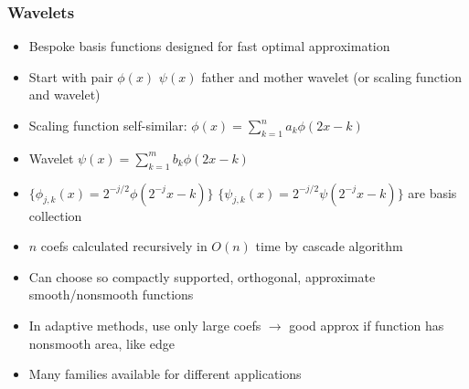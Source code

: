 \documentclass[bigger]{beamer}
\begin{document}
\begin{frame}%

\frametitle{Wavelets}

\begin{itemize}
\item Bespoke basis functions designed for fast optimal approximation
\item Start with pair $\phi(x)$ $\psi(x)$ father and mother wavelet (or scaling function and wavelet)
\item Scaling function self-similar: $\phi(x)=\sum_{k=1}^{n}a_k\phi(2x-k)$
\item Wavelet $\psi(x)=\sum_{k=1}^{m}b_k\phi(2x-k)$
\item $\{\phi_{j,k}(x)=2^{-j/2}\phi(2^{-j}x-k)\}$ $\{\psi_{j,k}(x)=2^{-j/2}\psi(2^{-j}x-k)\}$ are basis collection
\item $n$ coefs calculated recursively in $O(n)$ time by cascade algorithm
\item Can choose so compactly supported, orthogonal, approximate smooth/nonsmooth functions
\item In adaptive methods, use only large coefs $\to$ good approx if function has nonsmooth area, like edge
\item Many families available for different applications
\end{itemize}

\end{frame}%
\end{document}
